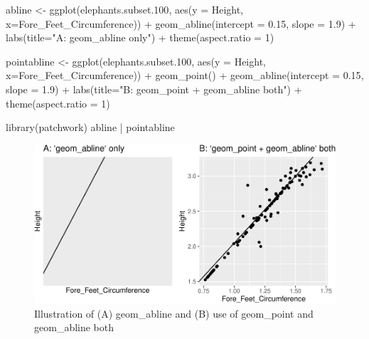 \documentclass[
]{book}
\newenvironment{Shaded}{\begin{snugshade}}{\end{snugshade}}
\newcommand{\AttributeTok}[1]{\textcolor[rgb]{0.77,0.63,0.00}{#1}}
\newcommand{\DecValTok}[1]{\textcolor[rgb]{0.00,0.00,0.81}{#1}}
\newcommand{\FloatTok}[1]{\textcolor[rgb]{0.00,0.00,0.81}{#1}}
\newcommand{\FunctionTok}[1]{\textcolor[rgb]{0.00,0.00,0.00}{#1}}
\newcommand{\NormalTok}[1]{#1}
\newcommand{\OtherTok}[1]{\textcolor[rgb]{0.56,0.35,0.01}{#1}}
\newcommand{\SpecialCharTok}[1]{\textcolor[rgb]{0.00,0.00,0.00}{#1}}
\newcommand{\StringTok}[1]{\textcolor[rgb]{0.31,0.60,0.02}{#1}}
\begin{document}
\begin{Shaded}
\begin{Highlighting}[]
\NormalTok{abline }\OtherTok{\textless{}{-}} \FunctionTok{ggplot}\NormalTok{(elephants.subset}\FloatTok{.100}\NormalTok{, }\FunctionTok{aes}\NormalTok{(}\AttributeTok{y =}\NormalTok{ Height, }\AttributeTok{x=}\NormalTok{Fore\_Feet\_Circumference)) }\SpecialCharTok{+} \FunctionTok{geom\_abline}\NormalTok{(}\AttributeTok{intercept =} \FloatTok{0.15}\NormalTok{, }\AttributeTok{slope =} \FloatTok{1.9}\NormalTok{) }\SpecialCharTok{+} 
  \FunctionTok{labs}\NormalTok{(}\AttributeTok{title=}\StringTok{"A: \textasciigrave{}geom\_abline\textasciigrave{} only"}\NormalTok{) }\SpecialCharTok{+}
  \FunctionTok{theme}\NormalTok{(}\AttributeTok{aspect.ratio =} \DecValTok{1}\NormalTok{)}

\NormalTok{pointabline }\OtherTok{\textless{}{-}} \FunctionTok{ggplot}\NormalTok{(elephants.subset}\FloatTok{.100}\NormalTok{, }\FunctionTok{aes}\NormalTok{(}\AttributeTok{y =}\NormalTok{ Height, }\AttributeTok{x=}\NormalTok{Fore\_Feet\_Circumference)) }\SpecialCharTok{+} 
  \FunctionTok{geom\_point}\NormalTok{() }\SpecialCharTok{+} 
  \FunctionTok{geom\_abline}\NormalTok{(}\AttributeTok{intercept =} \FloatTok{0.15}\NormalTok{, }\AttributeTok{slope =} \FloatTok{1.9}\NormalTok{) }\SpecialCharTok{+} 
  \FunctionTok{labs}\NormalTok{(}\AttributeTok{title=}\StringTok{"B: \textasciigrave{}geom\_point + geom\_abline\textasciigrave{} both"}\NormalTok{) }\SpecialCharTok{+}
  \FunctionTok{theme}\NormalTok{(}\AttributeTok{aspect.ratio =} \DecValTok{1}\NormalTok{)}

\FunctionTok{library}\NormalTok{(patchwork)}
\NormalTok{abline }\SpecialCharTok{|}\NormalTok{ pointabline}
\end{Highlighting}
\end{Shaded}

\begin{figure}
\centering
\includegraphics{Data-Visualisation-geom-Encyclopedia_files/figure-latex/unnamed-chunk-16-1.pdf}
\caption{\label{fig:unnamed-chunk-16}Illustration of (A) geom\_abline and (B) use of geom\_point and geom\_abline both}
\end{figure}
\end{document}
